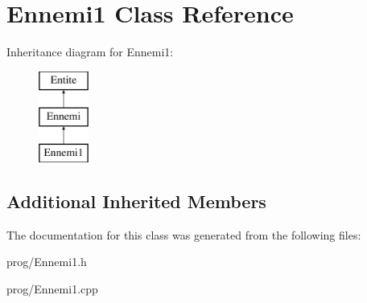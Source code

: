 \hypertarget{class_ennemi1}{}\section{Ennemi1 Class Reference}
\label{class_ennemi1}
Inheritance diagram for Ennemi1\+:\begin{figure}[H]
\begin{center}
\leavevmode
\includegraphics[height=3.000000cm]{class_ennemi1}
\end{center}
\end{figure}
\subsection*{Additional Inherited Members}


The documentation for this class was generated from the following files\+:\begin{DoxyCompactItemize}
\item 
prog/Ennemi1.\+h\item 
prog/Ennemi1.\+cpp\end{DoxyCompactItemize}
